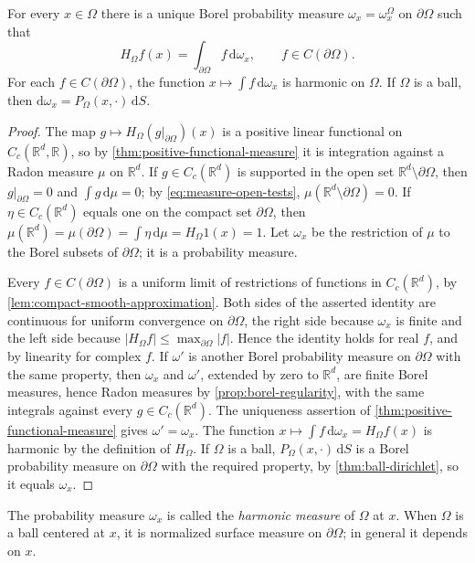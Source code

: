 \begin{proposition}\label{prop:harmonic-measure}
For every $x\in\Omega$ there is a unique Borel probability measure $\omega_x=\omega_x^\Omega$ on $\partial\Omega$ such that
\[
 H_\Omega f(x)=\int_{\partial\Omega}f\,\mathrm d\omega_x,\qquad f\in C(\partial\Omega).
\]
For each $f\in C(\partial\Omega)$, the function $x\mapsto\int f\,\mathrm d\omega_x$ is harmonic on $\Omega$. If $\Omega$ is a ball, then $\mathrm d\omega_x=P_\Omega(x,\cdot)\,\mathrm dS$.
\end{proposition}
\begin{proof}
The map $g\mapsto H_\Omega(g|_{\partial\Omega})(x)$ is a positive linear functional on $C_c(\mathbb R^d,\mathbb R)$, so by \cref{thm:positive-functional-measure} it is integration against a Radon measure $\mu$ on $\mathbb R^d$. If $g\in C_c(\mathbb R^d)$ is supported in the open set $\mathbb R^d\setminus\partial\Omega$, then $g|_{\partial\Omega}=0$ and $\int g\,\mathrm d\mu=0$; by \eqref{eq:measure-open-tests}, $\mu(\mathbb R^d\setminus\partial\Omega)=0$. If $\eta\in C_c(\mathbb R^d)$ equals one on the compact set $\partial\Omega$, then $\mu(\mathbb R^d)=\mu(\partial\Omega)=\int\eta\,\mathrm d\mu=H_\Omega1(x)=1$. Let $\omega_x$ be the restriction of $\mu$ to the Borel subsets of $\partial\Omega$; it is a probability measure.

Every $f\in C(\partial\Omega)$ is a uniform limit of restrictions of functions in $C_c(\mathbb R^d)$, by \cref{lem:compact-smooth-approximation}. Both sides of the asserted identity are continuous for uniform convergence on $\partial\Omega$, the right side because $\omega_x$ is finite and the left side because $|H_\Omega f|\leq\max_{\partial\Omega}|f|$. Hence the identity holds for real $f$, and by linearity for complex $f$. If $\omega'$ is another Borel probability measure on $\partial\Omega$ with the same property, then $\omega_x$ and $\omega'$, extended by zero to $\mathbb R^d$, are finite Borel measures, hence Radon measures by \cref{prop:borel-regularity}, with the same integrals against every $g\in C_c(\mathbb R^d)$. The uniqueness assertion of \cref{thm:positive-functional-measure} gives $\omega'=\omega_x$. The function $x\mapsto\int f\,\mathrm d\omega_x=H_\Omega f(x)$ is harmonic by the definition of $H_\Omega$. If $\Omega$ is a ball, $P_\Omega(x,\cdot)\,\mathrm dS$ is a Borel probability measure on $\partial\Omega$ with the required property, by \cref{thm:ball-dirichlet}, so it equals $\omega_x$.
\end{proof}

The probability measure $\omega_x$ is called the \emph{harmonic measure} of $\Omega$ at $x$. When $\Omega$ is a ball centered at $x$, it is normalized surface measure on $\partial\Omega$; in general it depends on $x$.

